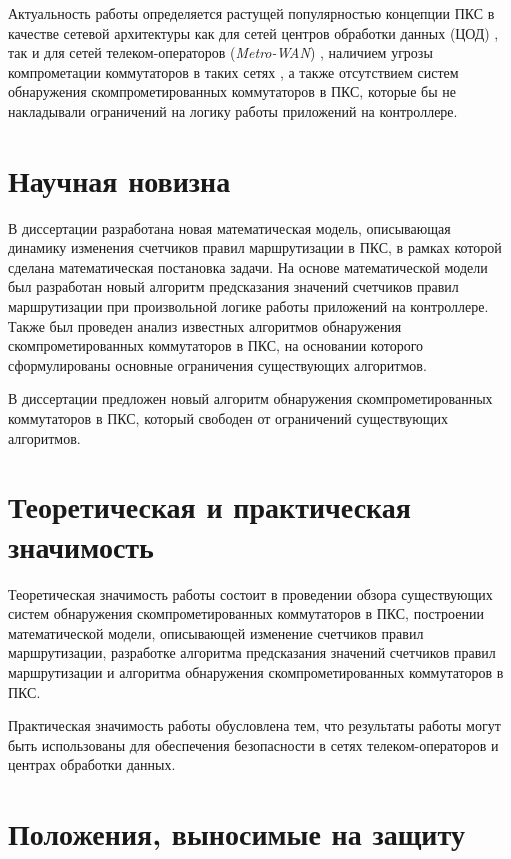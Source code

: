 \documentclass[../thesis.tex]{subfiles}
\begin{document}
Актуальность работы определяется растущей популярностью концепции ПКС в качестве сетевой архитектуры как для сетей центров обработки данных (ЦОД) \cite{kreutz2015software}, так и для сетей телеком-операторов (\textit{Metro-WAN}) \cite{jain2013b4}, наличием угрозы компрометации коммутаторов в таких сетях \cite{chao2016securing, garcia2014analysis}, а также отсутствием систем обнаружения скомпрометированных коммутаторов в ПКС, которые бы не накладывали ограничений на логику работы приложений на контроллере.

\section*{Научная новизна}

В диссертации разработана новая математическая модель, описывающая динамику изменения счетчиков правил маршрутизации в ПКС, в рамках которой сделана математическая постановка задачи.
На основе математической модели был разработан новый алгоритм предсказания значений счетчиков правил маршрутизации при произвольной логике работы приложений на контроллере.
Также был проведен анализ известных алгоритмов обнаружения скомпрометированных коммутаторов в ПКС, на основании которого сформулированы основные ограничения существующих алгоритмов.

В диссертации предложен новый алгоритм обнаружения скомпрометированных коммутаторов в ПКС, который свободен от ограничений существующих алгоритмов.

\section*{Теоретическая и практическая значимость}
Теоретическая значимость работы состоит в проведении обзора существующих систем обнаружения скомпрометированных коммутаторов в ПКС, построении математической модели, описывающей изменение счетчиков правил маршрутизации, разработке алгоритма предсказания значений счетчиков правил маршрутизации и алгоритма обнаружения скомпрометированных коммутаторов в ПКС.

Практическая значимость работы обусловлена тем, что результаты работы могут быть использованы для обеспечения безопасности в сетях телеком-операторов и центрах обработки данных.

\section*{Положения, выносимые на защиту}
\end{document}
